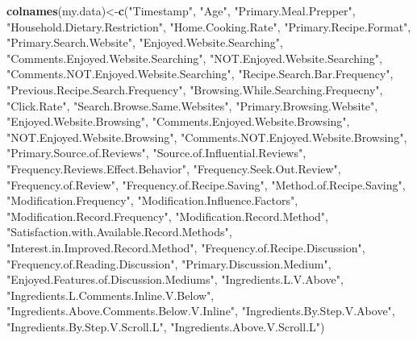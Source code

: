 \documentclass[
]{article}
\newenvironment{Shaded}{\begin{snugshade}}{\end{snugshade}}
\newcommand{\KeywordTok}[1]{\textcolor[rgb]{0.13,0.29,0.53}{\textbf{#1}}}
\newcommand{\NormalTok}[1]{#1}
\newcommand{\StringTok}[1]{\textcolor[rgb]{0.31,0.60,0.02}{#1}}
\begin{document}
\begin{Shaded}
\begin{Highlighting}[]
\KeywordTok{colnames}\NormalTok{(my.data)<-}\KeywordTok{c}\NormalTok{(}\StringTok{"Timestamp"}\NormalTok{, }\StringTok{"Age"}\NormalTok{, }\StringTok{"Primary.Meal.Prepper"}\NormalTok{, }\StringTok{"Household.Dietary.Restriction"}\NormalTok{,}
\StringTok{"Home.Cooking.Rate"}\NormalTok{, }
\StringTok{"Primary.Recipe.Format"}\NormalTok{, }
\StringTok{"Primary.Search.Website"}\NormalTok{,}
\StringTok{"Enjoyed.Website.Searching"}\NormalTok{, }\StringTok{"Comments.Enjoyed.Website.Searching"}\NormalTok{, }\StringTok{"NOT.Enjoyed.Website.Searching"}\NormalTok{, }\StringTok{"Comments.NOT.Enjoyed.Website.Searching"}\NormalTok{, }\StringTok{"Recipe.Search.Bar.Frequency"}\NormalTok{, }
\StringTok{"Previous.Recipe.Search.Frequency"}\NormalTok{,}
\StringTok{"Browsing.While.Searching.Frequecny"}\NormalTok{, }
\StringTok{"Click.Rate"}\NormalTok{, }
\StringTok{"Search.Browse.Same.Websites"}\NormalTok{,}
\StringTok{"Primary.Browsing.Website"}\NormalTok{, }
\StringTok{"Enjoyed.Website.Browsing"}\NormalTok{, }
\StringTok{"Comments.Enjoyed.Website.Browsing"}\NormalTok{, }\StringTok{"NOT.Enjoyed.Website.Browsing"}\NormalTok{, }\StringTok{"Comments.NOT.Enjoyed.Website.Browsing"}\NormalTok{, }\StringTok{"Primary.Source.of.Reviews"}\NormalTok{,}
\StringTok{"Source.of.Influential.Reviews"}\NormalTok{, }\StringTok{"Frequency.Reviews.Effect.Behavior"}\NormalTok{, }
\StringTok{"Frequency.Seek.Out.Review"}\NormalTok{, }
\StringTok{"Frequency.of.Review"}\NormalTok{, }
\StringTok{"Frequency.of.Recipe.Saving"}\NormalTok{, }
\StringTok{"Method.of.Recipe.Saving"}\NormalTok{, }
\StringTok{"Modification.Frequency"}\NormalTok{, }
\StringTok{"Modification.Influence.Factors"}\NormalTok{,}
\StringTok{"Modification.Record.Frequency"}\NormalTok{, }
\StringTok{"Modification.Record.Method"}\NormalTok{, }
\StringTok{"Satisfaction.with.Available.Record.Methods"}\NormalTok{, }
\StringTok{"Interest.in.Improved.Record.Method"}\NormalTok{,}
\StringTok{"Frequency.of.Recipe.Discussion"}\NormalTok{, }\StringTok{"Frequency.of.Reading.Discussion"}\NormalTok{,}
\StringTok{"Primary.Discussion.Medium"}\NormalTok{, }\StringTok{"Enjoyed.Features.of.Discussion.Mediums"}\NormalTok{, }\StringTok{"Ingredients.L.V.Above"}\NormalTok{, }
\StringTok{"Ingredients.L.Comments.Inline.V.Below"}\NormalTok{, }\StringTok{"Ingredients.Above.Comments.Below.V.Inline"}\NormalTok{, }\StringTok{"Ingredients.By.Step.V.Above"}\NormalTok{, }
\StringTok{"Ingredients.By.Step.V.Scroll.L"}\NormalTok{, }
\StringTok{"Ingredients.Above.V.Scroll.L"}\NormalTok{)}
\end{Highlighting}
\end{Shaded}
\end{document}
